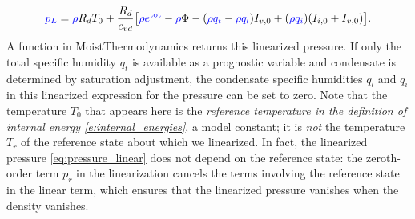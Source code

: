 \documentclass{report}
\begin{document}
{\begin{equation}\label{eq:pressure_linear}
\textcolor{blue}{p_L} = \textcolor{blue}{\rho} R_d T_0 + \frac{R_d}{c_{vd}} \bigl[ \textcolor{blue}{\rho e^{\mathrm{tot}}} - \textcolor{blue}{\rho} \Phi - (\textcolor{blue}{\rho q_t} - \textcolor{blue}{\rho q_l})I_{v,0} + (\textcolor{blue}{\rho q_i}) (I_{i,0} + I_{v,0}) \bigr].
\end{equation}
A function in MoistThermodynamics returns this linearized pressure. If only the total specific humidity $q_t$ is available as a prognostic variable and condensate is determined by saturation adjustment, the condensate specific humidities $q_l$ and $q_i$ in this linearized expression for the pressure can be set to zero. Note that the temperature $T_0$ that appears here is the \emph{reference temperature in the definition of internal energy \eqref{e:internal_energies}}, a model constant; it is \emph{not} the temperature $T_r$ of the reference state about which we linearized. In fact, the linearized pressure \eqref{eq:pressure_linear} does not depend on the reference state: the zeroth-order term $p_r$ in the linearization cancels the terms involving the reference state in the linear term, which ensures that the linearized pressure vanishes when the density vanishes. 

}
\end{document}

